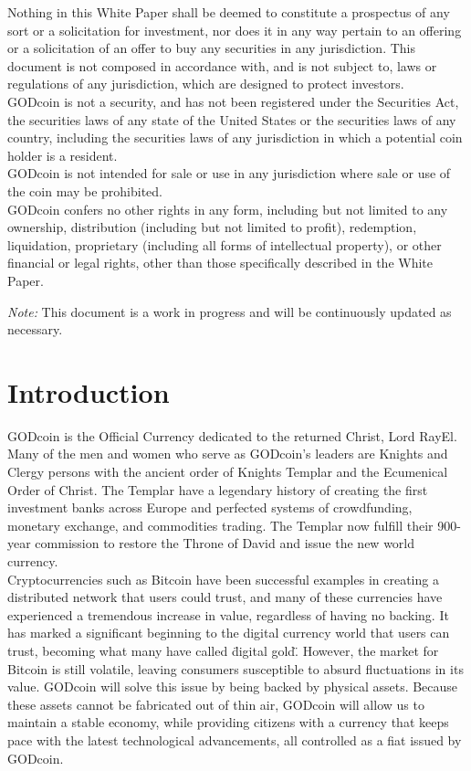 \documentclass[12pt,a4paper]{article}
\begin{document}
  Nothing in this White Paper shall be deemed to constitute a prospectus of any
  sort or a solicitation for investment, nor does it in any way pertain to an
  offering or a solicitation of an offer to buy any securities in any
  jurisdiction. This document is not composed in accordance with, and is not
  subject to, laws or regulations of any jurisdiction, which are designed to
  protect investors.\\

  GODcoin is not a security, and has not been registered under the Securities
  Act, the securities laws of any state of the United States or the securities
  laws of any country, including the securities laws of any jurisdiction in
  which a potential coin holder is a resident.\\

  GODcoin is not intended for sale or use in any jurisdiction where sale or use
  of the coin may be prohibited.\\

  GODcoin confers no other rights in any form, including but not limited to any
  ownership, distribution (including but not limited to profit), redemption,
  liquidation, proprietary (including all forms of intellectual property), or
  other financial or legal rights, other than those specifically described in
  the White Paper.

  \medskip
  \textit{Note:} This document is a work in progress and will be continuously
  updated as necessary.

  \newpage
  \tableofcontents
  \newpage

  \section{Introduction}
  GODcoin is the Official Currency dedicated to the returned Christ, Lord RayEl.
  Many of the men and women who serve as GODcoin’s leaders are Knights and
  Clergy persons with the ancient order of Knights Templar and the Ecumenical
  Order of Christ. The Templar have a legendary history of creating the first
  investment banks across Europe and perfected systems of crowdfunding, monetary
  exchange, and commodities trading. The Templar now fulfill their 900-year
  commission to restore the Throne of David and issue the new world currency.\\

  Cryptocurrencies such as Bitcoin have been successful examples in
  creating a distributed network that users could trust, and many of these
  currencies have experienced a tremendous increase in value, regardless of
  having no backing. It has marked a significant beginning to the digital
  currency world that users can trust, becoming what many have called \"digital
  gold\". However, the market for Bitcoin is still volatile, leaving
  consumers susceptible to absurd fluctuations in its value. GODcoin will solve
  this issue by being backed by physical assets. Because these assets cannot be
  fabricated out of thin air, GODcoin will allow us to maintain a stable
  economy, while providing citizens with a currency that keeps pace with the
  latest technological advancements, all controlled as a fiat issued by
  GODcoin.\\
\end{document}

